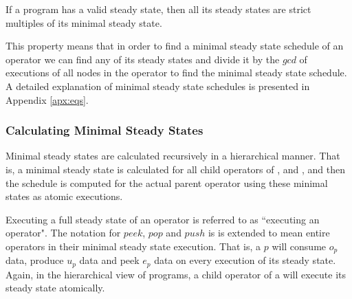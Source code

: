\begin{theorem}
If a {\StreamIt} program has a valid steady state, then all its
steady states are strict multiples of its minimal steady state.
\label{thm:multiplicity}
\end{theorem}

\begin{comment}
\begin{proof}[Multiplicity of Minimal Steady State]
Assume that there exists a steady state that is not a multiple of
the minimal steady state.  Let $m$ denote the minimal steady
state. Let $q$ denote the other steady state.  Note that $w = q -
m$ is still a steady state, as long as all elements of $w$ remain
non-negative (by Corollary \ref{corollary:composition}).  Repeat
subtracting $m$ from $q$ until no more subtractions can be
performed without generating at least one negative element in
vector $w$.  Since $q$ is not a multiple of $m$, $w \ne 0$. But
since we cannot subtract $m$ from $w$ any further, $\exists i, m_i
> w_i$.  Since $m$ is a minimal steady state and $w$ is a steady
state, this is impossible due to Corollary
\ref{corollary:minimal-state}. Thus there are no steady states
that are not multiples of the minimal steady schedule.
\end{proof}
\end{comment}

This property means that in order to find a minimal steady state
schedule of an operator we can find any of its steady states and
divide it by the $gcd$ of executions of all nodes in the operator
to find the minimal steady state schedule. A detailed explanation
of minimal steady state schedules is presented in Appendix
\ref{apx:eqs}.

\subsubsection{Calculating Minimal Steady States}
\label{sec:calc-min-steady}

Minimal steady states are calculated recursively in a hierarchical
manner. That is, a minimal steady state is calculated for all
child operators of {\pipeline}, {\splitjoin} and {\feedbackloop},
and then the schedule is computed for the actual parent operator
using these minimal states as atomic executions.
\begin{comment}
This yields a minimal steady state because all child operators
must execute their steady states (to avoid buffering changes), and
all steady states are multiples of the minimal steady states (per
Theorem \ref{thm:multiplicity}).
\end{comment}
Executing a full steady state of an operator is referred to as
``executing an operator". The notation for $peek$, $pop$ and
$push$ is is extended to mean entire operators in their minimal
steady state execution.  That is, a {\pipeline} $p$ will consume
$o_p$ data, produce $u_p$ data and peek $e_p$ data on every
execution of its steady state.  Again, in the hierarchical view of
{\StreamIt} programs, a child operator of a {\pipeline} will
execute its steady state atomically.

